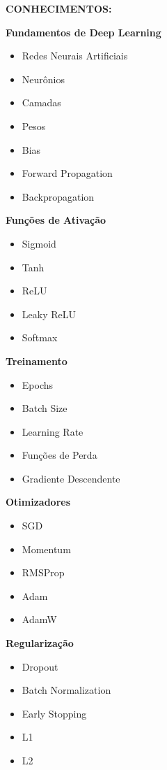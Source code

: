 \textbf{CONHECIMENTOS:}

\textbf{Fundamentos de Deep Learning}

\begin{itemize}
\item Redes Neurais Artificiais
\item Neurônios
\item Camadas
\item Pesos
\item Bias
\item Forward Propagation
\item Backpropagation
\end{itemize}

\textbf{Funções de Ativação}

\begin{itemize}
\item Sigmoid
\item Tanh
\item ReLU
\item Leaky ReLU
\item Softmax
\end{itemize}

\textbf{Treinamento}

\begin{itemize}
\item Epochs
\item Batch Size
\item Learning Rate
\item Funções de Perda
\item Gradiente Descendente
\end{itemize}

\textbf{Otimizadores}

\begin{itemize}
\item SGD
\item Momentum
\item RMSProp
\item Adam
\item AdamW
\end{itemize}

\textbf{Regularização}

\begin{itemize}
\item Dropout
\item Batch Normalization
\item Early Stopping
\item L1
\item L2
\end{itemize}


